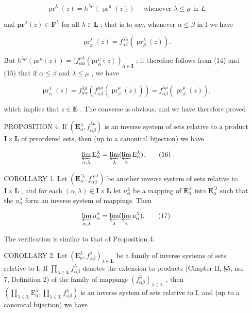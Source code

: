 \[
\operatorname{pr} ^ {\lambda} (z) = h ^ {\lambda \mu} (\operatorname{pr} ^ {\mu} (z)) \quad \text { whenever } \lambda \leqslant \mu \text { in } L\tag{14}
\]

and \(\mathbf{pr}^{\lambda}(z) \in \mathbf{F}^{\lambda}\) for all \(\lambda \in \mathbf{L}\) ; that is to say, whenever \(\alpha \leqslant \beta\) in I we have

\[
\operatorname{pr} _ {\alpha} ^ {\lambda} (z) = f _ {\alpha \beta} ^ {\lambda \lambda} (\operatorname{pr} _ {\beta} ^ {\lambda} (z)).\tag{15}
\]

But \(h^{\lambda \mu}(\mathrm{pr}^{\mu}(z)) = (f_{\alpha \alpha}^{\mu \lambda}(\mathrm{pr}_{\alpha}^{\mu}(z))_{\alpha \in \mathbf{I}}\) ; it therefore follows from (14) and (15) that if \(\alpha \leqslant \beta\) and \(\lambda \leqslant \mu\) , we have

\[
\operatorname{pr} _ {\alpha} ^ {\lambda} (z) = f _ {\alpha \alpha} ^ {\lambda \mu} (f _ {\alpha \beta} ^ {\mu \mu} (\operatorname{pr} _ {\beta} ^ {\mu} (z))) = f _ {\alpha \beta} ^ {\lambda \mu} (\operatorname{pr} _ {\beta} ^ {\mu} (z)),
\]

which implies that \(z \in \mathbf{E}\) . The converse is obvious, and we have therefore proved

PROPOSITION 4. If \((\mathbf{E}_{\alpha}^{\lambda}, f_{\alpha \beta}^{\lambda \mu})\) is an inverse system of sets relative to a product \(\mathbf{I} \times \mathbf{L}\) of preordered sets, then (up to a canonical bijection) we have

\[
\varprojlim_ {\alpha , \lambda} \mathrm{E} _ {\alpha} ^ {\lambda} = \varprojlim_ {\lambda} (\varprojlim_ {\alpha} \mathrm{E} _ {\alpha} ^ {\lambda}).\tag{16}
\]

COROLLARY 1. Let \((\mathbf{E}_{\alpha}^{\prime \lambda}, f_{\alpha \beta}^{\prime \mu \lambda})\) be another inverse system of sets relative to \(\mathbf{I} \times \mathbf{L}\) , and for each \((\alpha, \lambda) \in \mathbf{I} \times \mathbf{L}\) let \(u_{\alpha}^{\lambda}\) be a mapping of \(\mathbf{E}_{\alpha}^{\lambda}\) into \(\mathbf{E}_{\alpha}^{\prime \lambda}\) such that the \(u_{\alpha}^{\lambda}\) form an inverse system of mappings. Then

\[
\varprojlim_ {\alpha , \lambda} u _ {\alpha} ^ {\lambda} = \varprojlim_ {\lambda} (\varprojlim_ {\alpha} u _ {\alpha} ^ {\lambda}).\tag{17}
\]

The verification is similar to that of Proposition 4.

COROLLARY 2. Let \((\mathrm{E}_{\alpha}^{\lambda}, f_{\alpha \beta}^{\lambda})_{\lambda \in \mathbf{L}}\) be a family of inverse systems of sets relative to I. If \(\prod_{\lambda \in \mathbf{L}} f_{\alpha \beta}^{\lambda}\) denotes the extension to products (Chapter II, §5, no. 7, Definition 2) of the family of mappings \((f_{\alpha \beta}^{\lambda})_{\lambda \in \mathbf{L}}\) , then \(\left(\prod_{\lambda \in \mathbf{L}} \mathrm{E}_{\alpha}^{\lambda}, \prod_{\lambda \in \mathbf{L}} f_{\alpha \beta}^{\lambda}\right)\) is an inverse system of sets relative to I, and (up to a canonical bijection) we have

